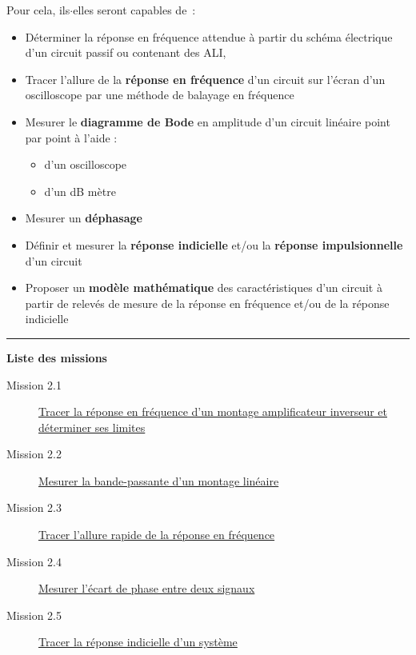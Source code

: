 \documentclass[a4paper,11pt]{article} %
\begin{document}
Pour cela, ils$\cdot$elles %
seront capables de~:
\begin{itemize}
	\item %
	Déterminer la réponse en fréquence attendue à partir du schéma électrique d'un circuit passif ou contenant des ALI,
	\item Tracer l'allure %
	de la \textbf{réponse en fréquence} d'un circuit sur l'écran d'un oscilloscope par une méthode de balayage en fréquence
	\item %
	Mesurer le \textbf{diagramme de Bode} en amplitude  d'un circuit linéaire point par point à l'aide :
	\begin{itemize}
		\item d'un oscilloscope
		\item d'un dB mètre
	\end{itemize}
	\item Mesurer un \textbf{déphasage}
	\item %
	Définir et mesurer la \textbf{réponse indicielle} et/ou la \textbf{réponse impulsionnelle} d'un circuit
	\item %
	Proposer un \textbf{modèle mathématique} des caractéristiques d'un circuit à partir de relevés de mesure de la réponse en fréquence et/ou de la réponse indicielle
\end{itemize}


\noindent \rule{\linewidth}{1pt}

\medskip

\textbf{\large Liste des missions}

\begin{description}
	\item[Mission 2.1] \hyperref[mission21]{Tracer la réponse en fréquence d'un montage amplificateur inverseur et déterminer ses limites}
	\item[Mission 2.2] \hyperref[mission22]{Mesurer la bande-passante d'un montage linéaire}	
	\item[Mission 2.3] \hyperref[mission23]{Tracer l'allure rapide de la réponse en fréquence}	
	\item[Mission 2.4] \hyperref[mission24]{Mesurer l'écart de phase entre deux signaux}
	\item[Mission 2.5] \hyperref[mission25]{Tracer la réponse indicielle d'un système}
\end{description}
\end{document}
